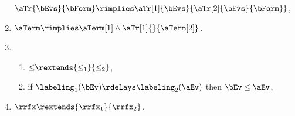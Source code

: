 \begin{definition}
\begin{multicols}{2}
\begin{enumerate}[topsep=0pt,label=(\textsc{s}\arabic*),ref=\textsc{s}\arabic*]
      $\aTr{\bEvs}{\bForm} \rimplies \aTr[1]{\bEvs}{\aTr[2]{\bEvs}{\bForm}}$,
    \item \label{seq-term}
      $\aTerm \rimplies \aTerm[1]\land\aTr[1]{}{\aTerm[2]}$.
    \item[] 
      \begin{enumerate}[leftmargin=0pt]
      \item \label{seq-le-extends}
        ${\le}\rextends{\le_1}{\le_2}$, 
      \item \label{seq-le-delays}
        if $\labeling_1(\bEv) \rdelays \labeling_2(\aEv)$ then $\bEv\le\aEv$,
      \end{enumerate}
    \item \label{seq-rf}
      ${\rrfx}\rextends{\rrfx_1}{\rrfx_2}$.
    \end{enumerate}
  \end{multicols}
  \medskip


\end{definition}
